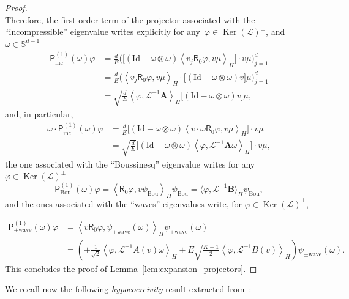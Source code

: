 \documentclass[AHL,Unicode,longabstracts,published]{cedram}
\DeclareMathOperator{\nul}{Ker}
\newcommand{\Id}{\mathrm{Id}}
\newcommand{\Wave}{\mathrm{wave}}
\newcommand{\Inc}{\mathrm{inc}}
\newcommand{\Bou}{\mathrm{Bou}}
\newcommand{\sfR}{\mathsf{R}}
\newcommand{\BurA}{{\mathbf{A}}}
\newcommand{\BurB}{{\mathbf{B}}}
\renewcommand{\S}{\mathbb{S}}
\newcommand{\LL}{\mathcal{L}}
\newcommand{\PP}{\mathsf{P}}
\newcommand{\Ss}{H}
\newcommand{\la}{\langle}
\newcommand{\ra}{\rangle}
\begin{document}
\begin{proof}
\[\]
Therefore, the first order term of the projector associated with the ``incompressible'' eigenvalue writes explicitly for any~$\varphi\in \nul(\LL)^{\perp}$, and $\omega \in \S^{d-1}$
\begin{align*}
\PP^{(1)}_\Inc(\omega) \varphi & = \frac{d}{E} \Bigg(\Big[\left(\Id - \omega \otimes \omega \right) \left\la v_j \sfR_0 \varphi, v \mu \right\ra_{\Ss} \Big] \cdot v \mu \Bigg)_{j=1}^d \\
&= \frac{d}{E} \Bigg(\left\la v_j \sfR_0 \varphi, v \mu \right\ra_{\Ss} \cdot \Big[\left(\Id - \omega \otimes \omega \right) v \Big] \mu \Bigg)_{j=1}^d \\
& = \sqrt{\frac{d}{E}} \left\la \varphi, \LL^{-1}\BurA \right\ra_{\Ss} \Big[\left(\Id - \omega \otimes \omega \right) v \Big] \mu,
\end{align*}
and, in particular,
\begin{align*}
\omega \cdot \PP^{(1)}_\Inc(\omega) \varphi & = \frac{d}{E} \Big[\left(\Id - \omega \otimes \omega \right) \left\la v \cdot \omega \sfR_0 \varphi, v \mu \right\ra_{\Ss} \Big] \cdot v \mu \\
& = \sqrt{\frac{d}{E}} \Big[\left(\Id - \omega \otimes \omega \right) \left\la \varphi, \LL^{-1}\BurA \omega \right\ra_{\Ss} \Big] \cdot v \mu,
\end{align*}
the one associated with the ``Boussinesq'' eigenvalue writes for any $\varphi \in \nul(\LL)^\perp$
\[
\PP^{(1)}_\Bou(\omega) \varphi = \left \langle \sfR_{0} \varphi, v \psi_\Bou \right \rangle_{\Ss} \psi_\Bou= \langle \varphi, \LL^{-1} \BurB \rangle_{\Ss} \psi_\Bou,
\]
and the ones associated with the ``waves'' eigenvalues write, for $\varphi\in \nul(\LL)^{\perp}$,

\break
\begin{align*}
\PP^{(1)}_{\pm \Wave}(\omega) \varphi&= \left \langle v \sfR_{0} \varphi, \psi_{\pm \Wave}(\omega) \right \rangle_{\Ss} \psi_{\pm \Wave}(\omega)\\
&= \left(\pm \frac{1}{\sqrt{2} } \left\langle \varphi, \LL^{-1} A(v) \omega \right\rangle_{\Ss} + E \sqrt{\frac{K-1}{2}} \left\langle \varphi, \LL^{-1} B(v) \right\rangle_{\Ss} \right) \psi_{\pm \Wave}(\omega).
\end{align*}
This concludes the proof of Lemma~\ref{lem:expansion_projectors}.
\end{proof}

We recall now the following \emph{hypocoercivity} result extracted from~\cite{D2011}:
\end{document}

